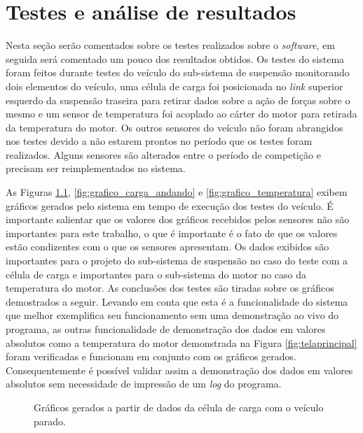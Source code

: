 \chapter{Testes e análise de resultados}
	\label{ch:testes}
Nesta seção serão comentados sobre os testes realizados sobre o \textit{software}, em seguida será comentado um pouco dos resultados obtidos. Os testes do sistema foram feitos durante testes do veículo do sub-sistema de suspensão monitorando dois elementos do veículo, uma célula de carga foi posicionada no \textit{link} superior esquerdo da suspensão traseira para retirar dados sobre a ação de forças sobre o mesmo e um sensor de temperatura foi acoplado ao cárter do motor para retirada da temperatura do motor. Os outros sensores do veículo não foram abrangidos nos testes devido a não estarem prontos no período que os testes foram realizados. Alguns sensores são alterados entre o período de competição e precisam ser reimplementados no sistema. 

As Figuras \ref{fig:grafico_carga_parado}, \ref{fig:grafico_carga_andando} e \ref{fig:grafico_temperatura} exibem gráficos gerados pelo sistema em tempo de execução dos testes do veículo. É importante salientar que os valores dos gráficos recebidos pelos sensores não são importantes para este trabalho, o que é importante é o fato de que os valores estão condizentes com o que os sensores apresentam. Os dados exibidos são importantes para o projeto do sub-sistema de suspensão no caso do teste com a célula de carga e importantes para o sub-sistema do motor no caso da temperatura do motor. As conclusões dos testes são tiradas sobre os gráficos demostrados a seguir. Levando em conta que esta é a funcionalidade do sistema que melhor exemplifica seu funcionamento sem uma demonstração ao vivo do programa, as outras funcionalidade de demonstração dos dados em valores absolutos como a temperatura do motor demonstrada na Figura \ref{fig:telaprincipal} foram verificadas e funcionam em conjunto com os gráficos gerados. Consequentemente é possível validar assim a demonstração dos dados em valores absolutos sem necessidade de impressão de um \textit{log} do programa.

 \begin{figure}[!htb]
	\center
	\caption{Gráficos gerados a partir de dados da célula de carga com o veículo parado.}
	\qquad
	\label{fig:grafico_carga_parado}
\end{figure}
     

